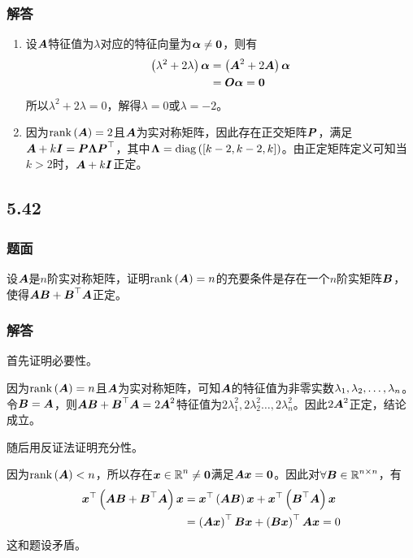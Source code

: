 \documentclass{beamer}
\begin{document}
\begin{frame}
    \frametitle{解答}
    \begin{enumerate}
        \item {
              设\(\mata\)特征值为\(\lambda\)对应的特征向量为\(\vecal\neq\veczero\)，则有
              \begin{align*}
                  \mypar{\lambda^2+2\lambda}\vecal & =\mypar{\mata^2+2\mata}\vecal \\
                                                   & =\mato\vecal=\veczero
              \end{align*}
              所以\(\lambda^2+2\lambda=0\)，解得\(\lambda=0\)或\(\lambda=-2\)。
              }\pause
        \item {
              因为\(\rank{\mata}=2\)且\(\mata\)为实对称矩阵，因此存在正交矩阵\(\matp\)，满足\(\mata+k\mati=\matp\matlam\matp^\top\)，其中\(\matlam=\diag{\mat{k-2,k-2,k}}\)。由正定矩阵定义可知当\(k>2\)时，\(\mata+k\mati\)正定。
              }
    \end{enumerate}
\end{frame}

\subsection*{5.42}
\begin{frame}
    \frametitle{题面}
    设\(\mata\)是\(n\)阶实对称矩阵，证明\(\rank{\mata}=n\)的充要条件是存在一个\(n\)阶实矩阵\(\matb\)，使得\(\mata\matb+\matb^\top\mata\)正定。
\end{frame}

\begin{frame}
    \frametitle{解答}
    首先证明必要性。

    因为\(\rank{\mata}=n\)且\(\mata\)为实对称矩阵，可知\(\mata\)的特征值为非零实数\(\enums{\lambda}{n}\)。
    令\(\matb=\mata\)，则\(\mata\matb+\matb^\top\mata=2\mata^2\)特征值为\(2\lambda_1^2,2\lambda_2^2\dots,2\lambda_n^2\)。因此\(2\mata^2\)正定，结论成立。
    \pause

    随后用反证法证明充分性。

    因为\(\rank{\mata}<n\)，所以存在\(\vecx\in\rea^n\neq\veczero\)满足\(\mata\vecx=\veczero\)。因此对\(\forall\matb\in\rea^{n\times n}\)，有
    \begin{align*}
        \vecx^\top\mypar{\mata\matb+\matb^\top\mata}\vecx & =\vecx^\top\mypar{\mata\matb}\vecx+\vecx^\top\mypar{\matb^\top\mata}\vecx \\
                                                          & =\mypar{\mata\vecx}^\top\matb\vecx+\mypar{\matb\vecx}^\top\mata\vecx=0
    \end{align*}
    这和题设矛盾。
\end{frame}
\end{document}
